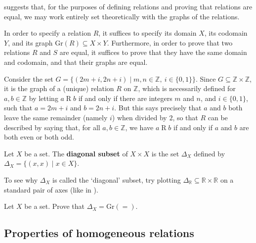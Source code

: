  suggests that, for the purposes of defining relations and proving that relations are equal, we may work entirely set theoretically with the graphs of the relations.

\begin{strategy}
\label{strRelationsAndGraphs}
In order to specify a relation $R$, it suffices to specify its domain $X$, its codomain $Y$, and its graph $\mathrm{Gr}(R) \subseteq X \times Y$. Furthermore, in order to prove that two relations $R$ and $S$ are equal, it suffices to prove that they have the same domain and codomain, and that their graphs are equal.
\end{strategy}

\begin{example}
Consider the set $G = \{ (2m+i, 2n+i) \mid m,n \in \mathbb{Z},~ i \in \{ 0,1 \} \}$. Since $G \subseteq \mathbb{Z} \times \mathbb{Z}$, it is the graph of a (unique) relation $R$ on $\mathbb{Z}$, which is necessarily defined for $a,b \in \mathbb{Z}$ by letting $a \mathrel{R} b$ if and only if there are integers $m$ and $n$, and $i \in \{0,1\}$, such that $a=2m+i$ and $b=2n+i$. But this says precisely that $a$ and $b$ both leave the same remainder (namely $i$) when divided by $2$, so that $R$ can be described by saying that, for all $a,b \in \mathbb{Z}$, we have $a \mathrel{R} b$ if and only if $a$ and $b$ are both even or both odd.
\end{example}

\begin{definition}
\label{defDiagonalSubset}
Let $X$ be a set. The \textbf{diagonal subset} of $X \times X$ is the set $\Delta_X$  defined by $\Delta_X = \{ (x,x) \mid x \in X \}$.
\end{definition}

To see why $\Delta_X$ is called the `diagonal' subset, try plotting $\Delta_{\mathbb{R}} \subseteq \mathbb{R} \times \mathbb{R}$ on a standard pair of axes (like in ).

\begin{exercise}
Let $X$ be a set. Prove that $\Delta_X = \mathrm{Gr}(=)$.
\end{exercise}

\subsection*{Properties of homogeneous relations}

